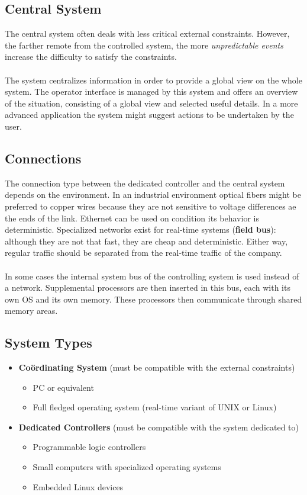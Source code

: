 \documentclass[../main.tex]{subfiles}
\begin{document}
\subsection{Central System}
The central system often deals with less critical external constraints. However, the farther remote from the controlled system, the more \textit{unpredictable events} increase the difficulty to satisfy the constraints. 
\\\\
The system centralizes information in order to provide a global view on the whole system. The operator interface is managed by this system and offers an overview of the situation, consisting of a global view and selected useful details. In a more advanced application the system might suggest actions to be undertaken by the user.

\subsection{Connections}
The connection type between the dedicated controller and the central system depends on the environment. In an industrial environment optical fibers might be preferred to copper wires because they are not sensitive to voltage differences ae the ends of the link. Ethernet can be used on condition its behavior is deterministic. Specialized networks exist for real-time systems (\textbf{field bus}): although they are not that fast, they are cheap and deterministic. Either way, regular traffic should be separated from the  real-time traffic of the company. 
\\\\
In some cases the internal system bus of the controlling system is used instead of a network. Supplemental processors are then inserted in this bus, each with its own OS and its own memory. These processors then communicate through shared memory areas.

\subsection{System Types}
\begin{itemize}
	\item \textbf{Co\"ordinating System} (must be compatible with the external constraints)
	\begin{itemize}
		\item PC or equivalent
		\item Full fledged operating system (real-time variant of UNIX or Linux)
	\end{itemize}
	\item \textbf{Dedicated Controllers} (must be compatible with the system dedicated to)
	\begin{itemize}
		\item Programmable logic controllers
		\item Small computers with specialized operating systems
		\item Embedded Linux devices
	\end{itemize}
\end{itemize}
\end{document}
